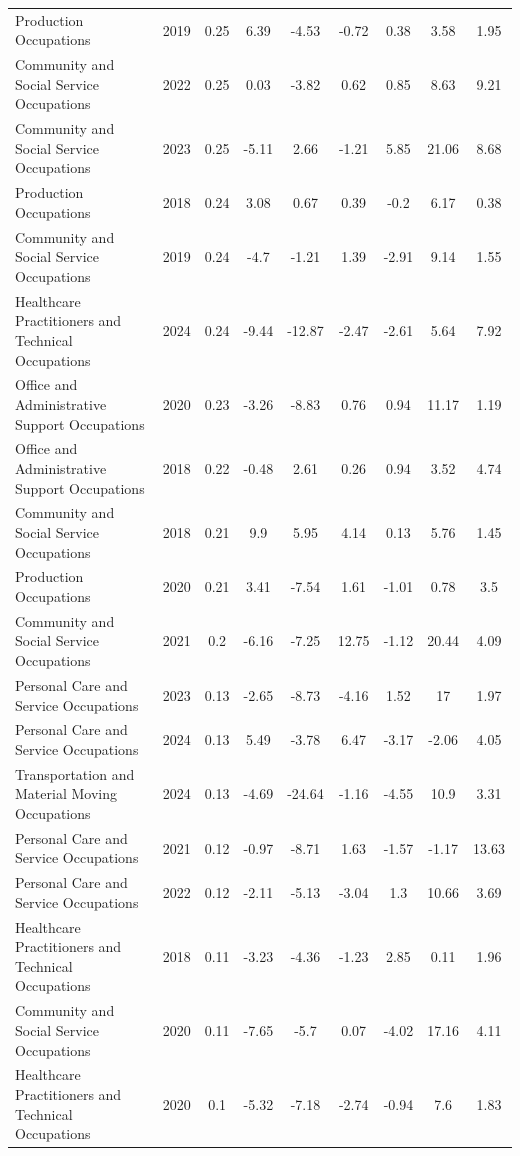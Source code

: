 \begin{table}[htbp]
\begin{tabular}{lcccccccc}
Production Occupations & 2019 & 0.25 & 6.39 & -4.53 & -0.72 & 0.38 & 3.58 & 1.95 \\
Community and Social Service Occupations & 2022 & 0.25 & 0.03 & -3.82 & 0.62 & 0.85 & 8.63 & 9.21 \\
Community and Social Service Occupations & 2023 & 0.25 & -5.11 & 2.66 & -1.21 & 5.85 & 21.06 & 8.68 \\
Production Occupations & 2018 & 0.24 & 3.08 & 0.67 & 0.39 & -0.2 & 6.17 & 0.38 \\
Community and Social Service Occupations & 2019 & 0.24 & -4.7 & -1.21 & 1.39 & -2.91 & 9.14 & 1.55 \\
Healthcare Practitioners and Technical Occupations & 2024 & 0.24 & -9.44 & -12.87 & -2.47 & -2.61 & 5.64 & 7.92 \\
Office and Administrative Support Occupations & 2020 & 0.23 & -3.26 & -8.83 & 0.76 & 0.94 & 11.17 & 1.19 \\
Office and Administrative Support Occupations & 2018 & 0.22 & -0.48 & 2.61 & 0.26 & 0.94 & 3.52 & 4.74 \\
Community and Social Service Occupations & 2018 & 0.21 & 9.9 & 5.95 & 4.14 & 0.13 & 5.76 & 1.45 \\
Production Occupations & 2020 & 0.21 & 3.41 & -7.54 & 1.61 & -1.01 & 0.78 & 3.5 \\
Community and Social Service Occupations & 2021 & 0.2 & -6.16 & -7.25 & 12.75 & -1.12 & 20.44 & 4.09 \\
Personal Care and Service Occupations & 2023 & 0.13 & -2.65 & -8.73 & -4.16 & 1.52 & 17 & 1.97 \\
Personal Care and Service Occupations & 2024 & 0.13 & 5.49 & -3.78 & 6.47 & -3.17 & -2.06 & 4.05 \\
Transportation and Material Moving Occupations & 2024 & 0.13 & -4.69 & -24.64 & -1.16 & -4.55 & 10.9 & 3.31 \\
Personal Care and Service Occupations & 2021 & 0.12 & -0.97 & -8.71 & 1.63 & -1.57 & -1.17 & 13.63 \\
Personal Care and Service Occupations & 2022 & 0.12 & -2.11 & -5.13 & -3.04 & 1.3 & 10.66 & 3.69 \\
Healthcare Practitioners and Technical Occupations & 2018 & 0.11 & -3.23 & -4.36 & -1.23 & 2.85 & 0.11 & 1.96 \\
Community and Social Service Occupations & 2020 & 0.11 & -7.65 & -5.7 & 0.07 & -4.02 & 17.16 & 4.11 \\
Healthcare Practitioners and Technical Occupations & 2020 & 0.1 & -5.32 & -7.18 & -2.74 & -0.94 & 7.6 & 1.83 \\

\end{tabular}
\end{table}
